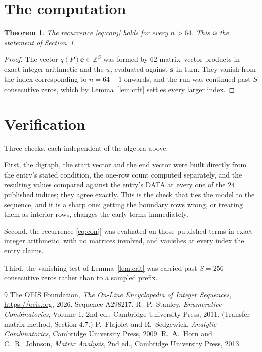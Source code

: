 \documentclass[11pt,a4paper]{article}
\theoremstyle{plain}
\newtheorem{theorem}{Theorem}
\theoremstyle{definition}
\begin{document}
\section{The computation}

\begin{theorem}
The recurrence \eqref{eq:conj} holds for every $n>64$. This is the statement of
Section~1.
\end{theorem}

\begin{proof}
The vector $q(P)\mathbf{e}\in\mathbb{Z}^{S}$ was formed by $62$ matrix--vector
products in exact integer arithmetic and the $u_j$ evaluated against $\mathbf{s}$ in turn.
They vanish from the index corresponding to $n=64+1$ onwards, and the run was continued
past $S$ consecutive zeros, which by Lemma~\ref{lem:crit} settles every larger index.
\end{proof}

\section{Verification}

Three checks, each independent of the algebra above.

First, the digraph, the start vector and the end vector were built directly from the
entry's stated condition, the one-row count computed separately, and the resulting values
compared against the entry's DATA at every one of the $24$ published indices; they
agree exactly. This is the check that ties the model to the sequence, and it is a sharp one:
getting the boundary rows wrong, or treating them as interior rows, changes the early terms
immediately.

Second, the recurrence \eqref{eq:conj} was evaluated on those published terms in exact
integer arithmetic, with no matrices involved, and vanishes at every index the entry claims.

Third, the vanishing test of Lemma~\ref{lem:crit} was carried past $S=256$ consecutive
zeros rather than to a sampled prefix.

\begin{thebibliography}{9}
 The OEIS Foundation, \emph{The On-Line Encyclopedia of Integer
Sequences}, \url{https://oeis.org}, 2026. Sequence A298217.
 R.~P.~Stanley, \emph{Enumerative Combinatorics}, Volume 1, 2nd ed.,
Cambridge University Press, 2011. (Transfer-matrix method, Section 4.7.)
 P.~Flajolet and R.~Sedgewick, \emph{Analytic Combinatorics}, Cambridge
University Press, 2009.
 R.~A.~Horn and C.~R.~Johnson, \emph{Matrix Analysis}, 2nd ed., Cambridge
University Press, 2013.
\end{thebibliography}
\end{document}
